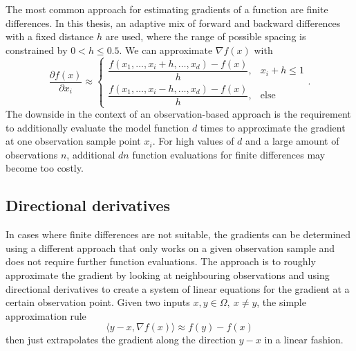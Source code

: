\documentclass[
  a4paper,  %
  twoside,  %
  bibliography=totoc,
  headsepline,
  cleardoublepage=empty,
  parskip=half,
  draft=false
]{scrbook}
\begin{document}
The most common approach for estimating gradients of a function are finite differences.
In this thesis, an adaptive mix of forward and backward differences with a fixed distance $h$ are used, where the range of possible spacing is constrained by $0 < h \leq 0.5$.
We can approximate $\nabla f(x)$ with
\begin{equation}
\frac{\partial f(x)}{\partial x_i} \approx
\begin{cases}
    \dfrac{f(x_1, \dots, x_i + h, \dots, x_d) - f(x)}{h}, & x_i + h \leq 1 \\[1.5em]
    \dfrac{f(x_1, \dots, x_i - h, \dots, x_d) - f(x)}{h}, & \text{else}
\end{cases}.
\end{equation}
%
The downside in the context of an observation-based approach is the requirement to additionally evaluate the model function $d$ times to approximate the gradient at one observation sample point $x_i$.
For high values of $d$ and a large amount of observations $n$, additional $dn$ function evaluations for finite differences may become too costly.

\subsection{Directional derivatives}

In cases where finite differences are not suitable, the gradients can be determined using a different approach that only works on a given observation sample and does not require further function evaluations.
The approach is to roughly approximate the gradient by looking at neighbouring observations and using directional derivatives to create a system of linear equations for the gradient at a certain observation point.
Given two inputs $x, y \in \Omega, ~ x \neq y$, the simple approximation rule
\begin{equation}
\langle y-x, \nabla f(x) \rangle \approx f(y) - f(x)
\end{equation}
then just extrapolates the gradient along the direction $y-x$ in a linear fashion.
\end{document}
